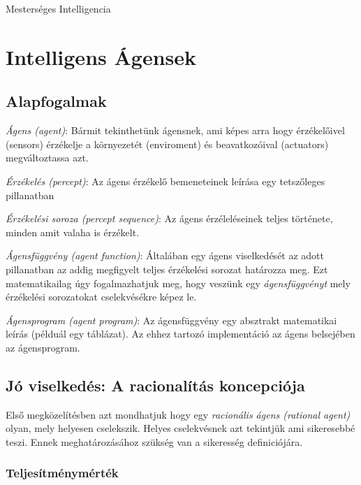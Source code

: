 \documentclass[a4paper,10pt]{scrbook}
\begin{document}
Mesterséges Intelligencia 

\chapter{Intelligens Ágensek}

\section{Alapfogalmak}

\emph{Ágens (agent)}: Bármit tekinthetünk ágensnek, ami képes arra hogy érzékelőivel 
(sensors) érzékelje a környezetét (enviroment) és beavatkozóival (actuators)
megváltoztassa azt. 

\bigskip
\noindent
\emph{Érzékelés (percept)}: Az ágens érzékelő bemeneteinek leírása egy 
tetszőleges pillanatban

\bigskip
\noindent
\emph{Érzékelési soroza (percept sequence)}: Az ágens érzéleléseinek teljes 
története, minden amit valaha is érzékelt. 

\bigskip
\noindent
\emph{Ágensfüggvény (agent function)}: Általában egy ágens viselkedését az adott 
pillanatban az addig megfigyelt teljes érzékelési sorozat határozza meg. Ezt 
matematikailag úgy fogalmazhatjuk meg, hogy veszünk egy \emph{ágensfüggvényt} mely 
érzékelési sorozatokat cselekvésékre képez le. 

\bigskip
\noindent 
\emph{Ágensprogram (agent program)}: Az ágensfüggvény egy absztrakt matematikai leírás 
(példuál egy táblázat). Az ehhez tartozó implementáció az ágens belsejében az ágensprogram.

\section{Jó viselkedés: A racionalítás koncepciója}

Első megközelítésben azt mondhatjuk hogy egy \emph{racionális ágens (rational agent)} 
olyan, mely helyesen cselekszik. Helyes cselekvésnek azt tekintjük ami sikeresebbé teszi. 
Ennek meghatározásához szükség van a sikeresség definiciójára. 

\subsection{Teljesítménymérték}
\end{document}
